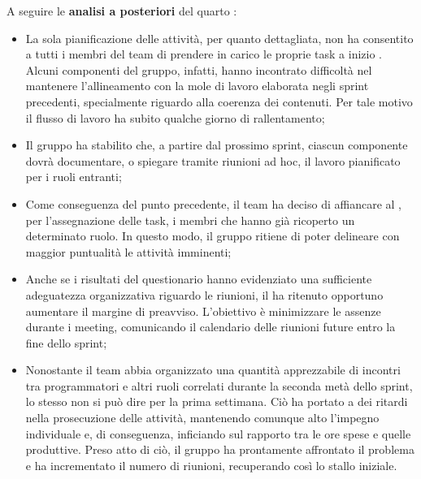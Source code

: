 \vspace{0.5\baselineskip}
\par A seguire le \textbf{analisi a posteriori} del quarto :
\begin{itemize}
  \item La sola pianificazione delle attività, per quanto dettagliata, non ha consentito a tutti i membri del team di prendere in carico le proprie task a inizio . Alcuni componenti del gruppo, infatti, hanno incontrato difficoltà nel mantenere l'allineamento con la mole di lavoro elaborata negli sprint precedenti, specialmente riguardo alla coerenza dei contenuti. Per tale motivo il flusso di lavoro ha subito qualche giorno di rallentamento;
  \item Il gruppo ha stabilito che, a partire dal prossimo sprint, ciascun componente dovrà documentare, o spiegare tramite riunioni ad hoc, il lavoro pianificato per i ruoli entranti;
  \item Come conseguenza del punto precedente, il team ha deciso di affiancare al \Responsabile{}, per l'assegnazione delle task, i membri che hanno già ricoperto un determinato ruolo. In questo modo, il gruppo ritiene di poter delineare con maggior puntualità le attività imminenti;
  \item Anche se i risultati del questionario hanno evidenziato una sufficiente adeguatezza organizzativa riguardo le riunioni, il \Responsabile{} ha ritenuto opportuno aumentare il margine di preavviso. L'obiettivo è minimizzare le assenze durante i meeting, comunicando il calendario delle riunioni future entro la fine dello sprint;
  \item Nonostante il team abbia organizzato una quantità apprezzabile di incontri tra programmatori e altri ruoli correlati durante la seconda metà dello sprint, lo stesso non si può dire per la prima settimana. Ciò ha portato a dei ritardi nella prosecuzione delle attività, mantenendo comunque alto l'impegno individuale e, di conseguenza, inficiando sul rapporto tra le ore spese e quelle produttive. Preso atto di ciò, il gruppo ha prontamente affrontato il problema e ha incrementato il numero di riunioni, recuperando così lo stallo iniziale.
\end{itemize}

